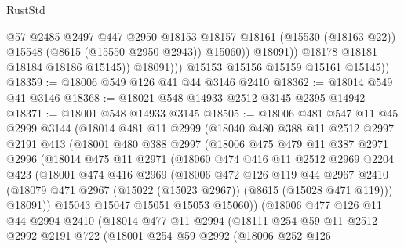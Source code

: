 \begin{lexlean}{RustStd}
\begin{coremodule}
                          @57
                          @2485
                          @2497
                          @447
                          @2950
                          @18153
                          @18157
                          @18161
                          (@15530 (@18163 @22))
                          @15548
                          (@8615 (@15550 @2950 @2943))
                          @15060))
                      @18091))
                  @18178
                  @18181
                  @18184
                  @18186
                  @15145))
              @18091)))
        @15153
        @15156
        @15159
        @15161
        @15145))
@18359 := @18006 @549 @126 @41 @44 @3146 @2410
@18362 := @18014 @549 @41 @3146
@18368 := @18021 @548 @14933 @2512 @3145 @2395 @14942
@18371 := @18001 @548 @14933 @3145
@18505 := @18006
    @481
    @547
    @11
    @45
    @2999
    @3144
    (@18014
      @481
      @11
      @2999
      (@18040
        @480
        @388
        @11
        @2512
        @2997
        @2191
        @413
        (@18001
          @480
          @388
          @2997
          (@18006
            @475
            @479
            @11
            @387
            @2971
            @2996
            (@18014
              @475
              @11
              @2971
              (@18060
                @474
                @416
                @11
                @2512
                @2969
                @2204
                @423
                (@18001
                  @474
                  @416
                  @2969
                  (@18006
                    @472
                    @126
                    @119
                    @44
                    @2967
                    @2410
                    (@18079 @471 @2967 (@15022 (@15023 @2967)) (@8615 (@15028 @471 @119)))
                    @18091))
                @15043
                @15047
                @15051
                @15053
                @15060))
            (@18006
              @477
              @126
              @11
              @44
              @2994
              @2410
              (@18014
                @477
                @11
                @2994
                (@18111
                  @254
                  @59
                  @11
                  @2512
                  @2992
                  @2191
                  @722
                  (@18001
                    @254
                    @59
                    @2992
                    (@18006
                      @252
                      @126

\end{coremodule}
\end{lexlean}
